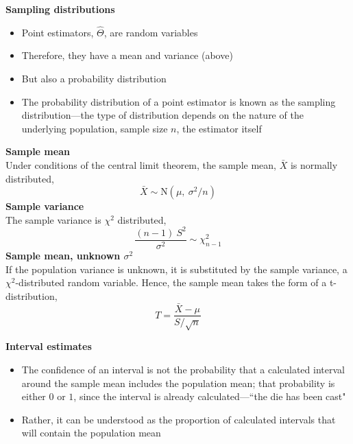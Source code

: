 \documentclass[a4paper]{article}
\newcommand{\heading}[1]{{\small\textbf{#1}}}
\newcommand{\subheading}[1]{{\scriptsize\textbf{#1}}}
\begin{document}
\begin{multicols*}{4}
\heading{Sampling distributions}
\begin{itemize} \itemsep -0.5em
    \item Point estimators, $\hat\Theta$, are random variables
    \item Therefore, they have a mean and variance (above)
    \item But also a probability distribution
    \item The probability distribution of a point estimator is known as
        the sampling distribution---the type of distribution depends on
        the nature of the underlying population, sample size $n$, the
        estimator itself
\end{itemize}
\subheading{Sample mean} \\
Under conditions of the central limit theorem, the sample mean, 
$\bar{X}$ is normally distributed, 
    $$ \bar{X} \sim \mathrm{N}(\mu,\ \sigma^2/n) $$
\subheading{Sample variance} \\
The sample variance is $\chi^2$ distributed,
    $$ \frac{(n-1)\ S^2}{\sigma^2} \sim \chi^2_{n-1} $$
\subheading{Sample mean, unknown $\sigma^2$} \\
If the population variance is unknown, it is substituted by the sample
variance, a $\chi^2$-distributed random variable. Hence, the sample mean
takes the form of a t-distribution,
    $$ T = \frac{\bar{X} - \mu}{S/\sqrt{n}} $$

\heading{Interval estimates}
\begin{itemize} \itemsep -0.5em
    \item The confidence of an interval is not the probability that a
        calculated interval around the sample mean includes the 
        population mean; that probability is either $0$ or $1$, since
        the interval is already calculated---``the die has been cast"
    \item Rather, it can be understood as the proportion of calculated
        intervals that will contain the population mean
\end{itemize}


\end{multicols*}
\end{document}
